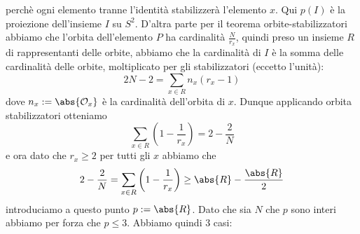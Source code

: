 \documentclass[11pt]{scrartcl}
\begin{document}
	perchè ogni elemento tranne l'identità stabilizzerà l'elemento $x$. Qui $p(I)$ è la proiezione dell'insieme $I$ su $S^2$. D'altra parte per il teorema orbite-stabilizzatori abbiamo che l'orbita dell'elemento $P$ ha cardinalità $\frac{N}{r_x}$, quindi preso un insieme $R$ di rappresentanti delle orbite, abbiamo che la cardinalità di $I$ è la somma delle cardinalità delle orbite, moltiplicato per gli stabilizzatori (eccetto l'unità):
	$$2N-2=\sum_{x\in R}n_x\left(r_x-1\right)$$
	dove $n_x:=\abs{\mathcal{O}_x}$ è la cardinalità dell'orbita di $x$. Dunque applicando orbita stabilizzatori otteniamo
	$$\sum_{x\in R}\left(1-\frac{1}{r_x}\right)=2-\frac{2}{N}$$
	e ora dato che $r_x\ge 2$ per tutti gli $x$ abbiamo che 
	$$2-\frac{2}{N}=\sum_{x\in R}\left(1-\frac{1}{r_x}\right)\ge \abs{R}-\frac{\abs{R}}{2}$$
	introduciamo a questo punto $p:=\abs{R}$. Dato che sia $N$ che $p$ sono interi abbiamo per forza che $p\le 3$. Abbiamo quindi $3$ casi:
\end{document}
